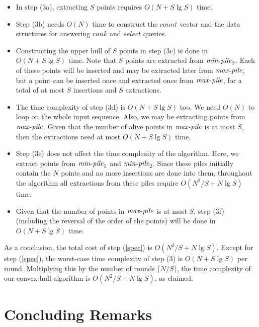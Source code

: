 \documentclass[final,onetabnum,onefignum,onethmnum]{siamltex}
\newcommand{\Rank}{\mbox{$\mathit{rank}$}}
\newcommand{\Select}{\mbox{$\mathit{select}$}}
\newcommand{\MinOne}{\mbox{$\mathit{min}\mbox{\rm -}\mathit{pile}_1$}}
\newcommand{\MinTwo}{\mbox{$\mathit{min}\mbox{\rm -}\mathit{pile}_2$}}
\newcommand{\MaxPile}{\mbox{$\mathit{max}\mbox{\rm -}\mathit{pile}$}}
\begin{document}
\begin{itemize}

\item In step (3a), extracting $S$ points requires $O(N + S \lg S)$
  time.

\item Step (3b) needs $O(N)$ time to construct the $\mathit{count}$
  vector and the data structures for answering \Rank{} and \Select{}
  queries.

\item Constructing the upper hull of $S$ points in step (3c) is done in
  $O(N + S \lg S)$ time.
Note that $S$ points are extracted from \MinTwo{}. Each of these
points will be inserted and may be extracted later from \MaxPile{}, but
a point can be inserted once and extracted once from \MaxPile{}, for a
total of at most $S$ insertions and $S$ extractions.

\item The time complexity of step (3d) is $O(N + S \lg S)$ too. We need
  $O(N)$ to loop on the whole input sequence. Also, we may be
  extracting points from \MaxPile{}. Given that the number of alive
  points in \MaxPile{} is at most $S$, then the extractions need at
  most $O(N + S \lg S)$ time.

\item Step (3e) does not affect the time complexity of the
  algorithm. Here, we extract points from \MinOne{} and
  \MinTwo{}. Since these piles initially contain the $N$ points and no
  more insertions are done into them, throughout the algorithm all
  extractions from these piles require $O(N^2/S + N \lg S)$ time.

\item Given that the number of points in \MaxPile{} is at most $S$,
  step (3f) (including the reversal of the order of the points) 
	will be done in $O(N + S \lg S)$ time.
\end{itemize}

As a conclusion, the total cost of step (\ref{spec}) is $O(N^2/S +
N\lg S)$. Except for step (\ref{spec}), the worst-case time complexity
of step (3) is $O(N + S \lg S)$ per round. Multiplying this by the
number of rounds $\lceil N/S \rceil$, the time complexity of our
convex-hull algorithm is $O(N^2/S + N \lg S)$, as claimed.

\section{Concluding Remarks}
\label{sec:remarks}
\end{document}
